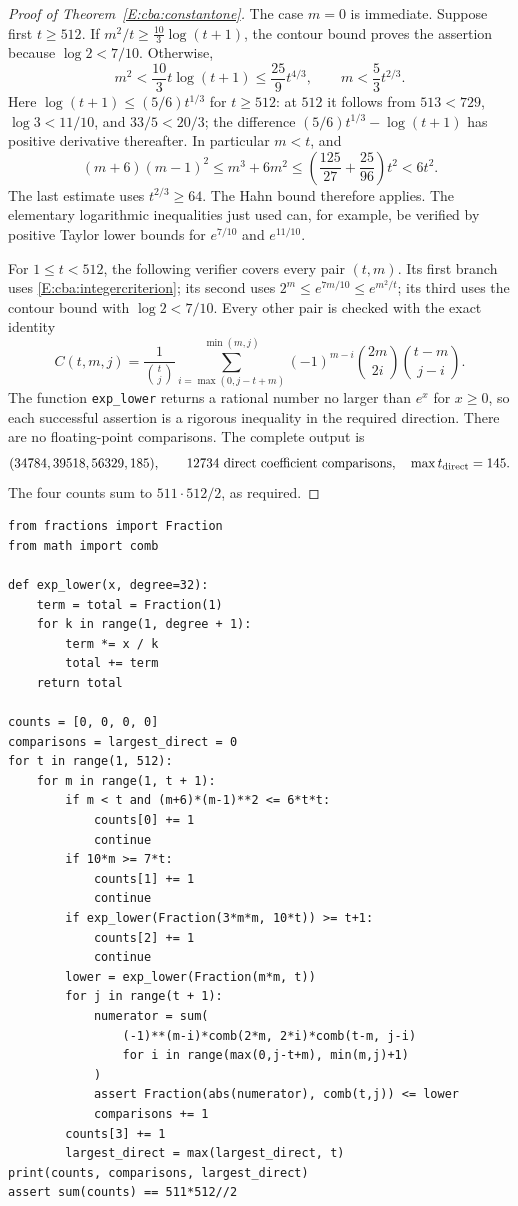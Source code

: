 \documentclass[11pt,a4paper]{article}
\theoremstyle{definition}
\theoremstyle{remark}
\numberwithin{equation}{section}
\begin{document}
\begin{proof}[Proof of Theorem~\ref{E:cba:constantone}]
The case $m=0$ is immediate. Suppose first $t\ge512$.
If $m^2/t\ge\frac{10}{3}\log(t+1)$, the contour bound proves the
assertion because $\log2<7/10$. Otherwise,
\[
 m^2<\frac{10}{3}t\log(t+1)\le\frac{25}{9}t^{4/3},
 \qquad m<\frac53t^{2/3}.
\]
Here $\log(t+1)\le(5/6)t^{1/3}$ for $t\ge512$: at $512$ it follows
from $513<729$, $\log3<11/10$, and $33/5<20/3$; the difference
$(5/6)t^{1/3}-\log(t+1)$ has positive derivative thereafter.
In particular $m<t$, and
\[
 (m+6)(m-1)^2\le m^3+6m^2
 \le\left(\frac{125}{27}+\frac{25}{96}\right)t^2<6t^2.
\]
The last estimate uses $t^{2/3}\ge64$. The Hahn bound therefore applies.
The elementary logarithmic inequalities just used can, for example, be
verified by positive Taylor lower bounds for $e^{7/10}$ and $e^{11/10}$.

For $1\le t<512$, the following verifier covers every pair $(t,m)$.
Its first branch uses \eqref{E:cba:integercriterion}; its second uses
$2^m\le e^{7m/10}\le e^{m^2/t}$; its third uses the contour bound with
$\log2<7/10$. Every other pair is checked with the exact identity
\begin{equation}\label{E:cba:exactcoeff}
 C(t,m,j)=\frac1{\binom tj}
 \sum_{i=\max(0,j-t+m)}^{\min(m,j)}
 (-1)^{m-i}\binom{2m}{2i}\binom{t-m}{j-i}.
\end{equation}
The function \texttt{exp\_lower} returns a rational number no larger
than $e^x$ for $x\ge0$, so each successful assertion is a rigorous
inequality in the required direction. There are no floating-point
comparisons. The complete output is
\[
 (34784,39518,56329,185),\qquad
 12734\ \hbox{direct coefficient comparisons},\quad
 \max t_{\rm direct}=145.
\]
The four counts sum to $511\cdot512/2$, as required.
\end{proof}

\noindent\begin{minipage}{\textwidth}\small
\begin{verbatim}
from fractions import Fraction
from math import comb

def exp_lower(x, degree=32):
    term = total = Fraction(1)
    for k in range(1, degree + 1):
        term *= x / k
        total += term
    return total

counts = [0, 0, 0, 0]
comparisons = largest_direct = 0
for t in range(1, 512):
    for m in range(1, t + 1):
        if m < t and (m+6)*(m-1)**2 <= 6*t*t:
            counts[0] += 1
            continue
        if 10*m >= 7*t:
            counts[1] += 1
            continue
        if exp_lower(Fraction(3*m*m, 10*t)) >= t+1:
            counts[2] += 1
            continue
        lower = exp_lower(Fraction(m*m, t))
        for j in range(t + 1):
            numerator = sum(
                (-1)**(m-i)*comb(2*m, 2*i)*comb(t-m, j-i)
                for i in range(max(0,j-t+m), min(m,j)+1)
            )
            assert Fraction(abs(numerator), comb(t,j)) <= lower
            comparisons += 1
        counts[3] += 1
        largest_direct = max(largest_direct, t)
print(counts, comparisons, largest_direct)
assert sum(counts) == 511*512//2
\end{verbatim}
\end{minipage}
\end{document}
